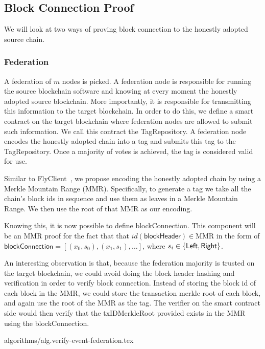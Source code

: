 \subsection{Block Connection Proof}

We will look at two ways of proving block connection to the honestly adopted source chain.

\subsubsection{Federation}
A federation of $m$ nodes is picked. A federation node is responsible for running the source blockchain software and knowing at every moment the honestly adopted source blockchain. More importantly, it is responsible for transmitting this information to the target blockchain. In order to do this, we define a smart contract on the target blockchain where federation nodes are allowed to submit such information. We call this contract the \textsf{TagRepository}. A federation node encodes the honestly adopted chain into a tag and submits this tag to the \textsf{TagRepository}. Once a majority of votes is achieved, the tag is considered valid for use.

Similar to FlyClient~\cite{flyclient}, we propose encoding the honestly adopted chain by using a Merkle Mountain Range (MMR). Specifically, to generate a tag we take all the chain's block ids in sequence and use them as leaves in a Merkle Mountain Range. We then use the root of that MMR as our encoding.

Knowing this, it is now possible to define \textsf{blockConnection}. This component will be an MMR proof for the fact that that $id(\mathsf{blockHeader}) \in \text{MMR}$ in the form of $\mathsf{blockConnection} = [(x_0, s_0), (x_1, s_1), \dots]$, where $s_i \in \sf\{Left, Right\}$.

An interesting observation is that, because the federation majority is trusted on the target blockchain, we could avoid doing the block header hashing and verification in order to verify block connection. Instead of storing the block id of each block in the MMR, we could store the transaction merkle root of each block, and again use the root of the MMR as the tag. The verifier on the smart contract side would then verify that the \textsf{txIDMerkleRoot} provided exists in the MMR using the \textsf{blockConnection}.

{algorithms/alg.verify-event-federation.tex}

